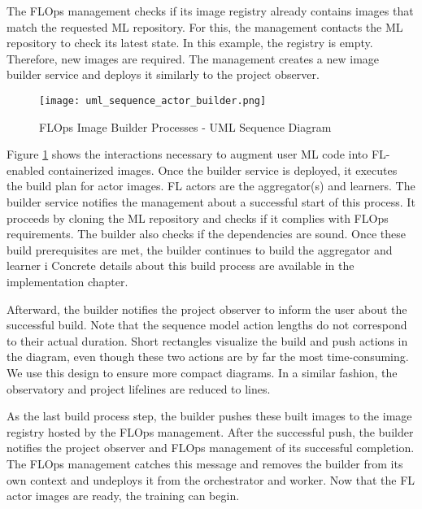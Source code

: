 The FLOps management checks if its image registry already contains images that match the requested ML repository.
For this, the management contacts the ML repository to check its latest state.
In this example, the registry is empty.
Therefore, new images are required.
The management creates a new image builder service and deploys it similarly to the project observer.

\begin{figure}[h]
    \begin{adjustwidth}{-0.2\paperwidth}{-0.2\paperwidth}
        \centering
        \texttt{[image: uml\_sequence\_actor\_builder.png]}
        \caption{FLOps Image Builder Processes - UML Sequence Diagram}
        \label{fig:uml_sequence_builder}
    \end{adjustwidth}
\end{figure}

Figure \ref{fig:uml_sequence_builder} shows the interactions necessary to augment user ML code into FL-enabled containerized images.
Once the builder service is deployed, it executes the build plan for actor images.
FL actors are the aggregator(s) and learners.
The builder service notifies the management about a successful start of this process.
It proceeds by cloning the ML repository and checks if it complies with FLOps requirements.
The builder also checks if the dependencies are sound.
Once these build prerequisites are met, the builder continues to build the aggregator and learner i
Concrete details about this build process are available in the implementation chapter.

Afterward, the builder notifies the project observer to inform the user about the successful build.
Note that the sequence model action lengths do not correspond to their actual duration.
Short rectangles visualize the build and push actions in the diagram, even though these two actions are by far the most time-consuming.
We use this design to ensure more compact diagrams.
In a similar fashion, the observatory and project lifelines are reduced to lines.

As the last build process step, the builder pushes these built images to the image registry hosted by the FLOps management.
After the successful push, the builder notifies the project observer and FLOps management of its successful completion.
The FLOps management catches this message and removes the builder from its own context and undeploys it from the orchestrator and worker.
Now that the FL actor images are ready, the training can begin.

